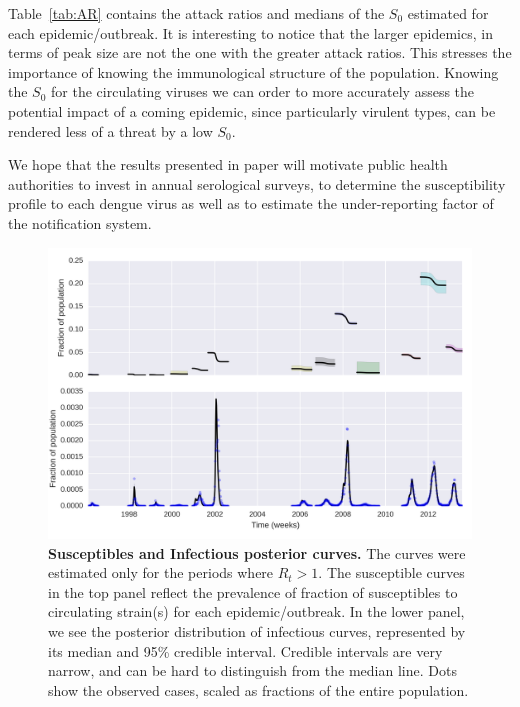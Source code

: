\documentclass[10pt]{article}
\begin{document}
Table~\ref{tab:AR} contains the attack ratios and medians of the $S_0$ 
estimated for each epidemic/outbreak.
It is interesting to notice that the larger epidemics, in terms of peak size are 
not the one with the greater attack ratios.
This stresses the importance of knowing the immunological structure of the 
population. Knowing the $S_0$ for the circulating viruses we can order to more 
accurately assess the potential impact of a coming epidemic, since particularly 
virulent types, can be rendered less of a threat by a low $S_0$.

We hope that the results presented in paper will motivate public 
health authorities to invest in annual serological surveys, to determine the 
susceptibility profile to each dengue virus as well as to estimate the 
under-reporting factor of the notification system.

\begin{figure}[!ht]
\begin{center}
\includegraphics[width=\textwidth]{plots/concat_SI.png}
\end{center}
\caption{
{\bf Susceptibles and Infectious posterior curves.}  The curves were estimated 
only for the periods where $R_t> 1$.  The susceptible curves in the top panel 
reflect the prevalence of fraction of susceptibles to circulating strain(s) for 
each epidemic/outbreak.
In the lower panel, we see the posterior distribution 
of infectious curves, represented by its median and 95\% credible interval.
Credible intervals are very narrow, and can be hard to distinguish from the 
median line. 
Dots show the observed cases, scaled as fractions of the entire 
population.
}
\label{Fig:S0}
\end{figure}
\end{document}
